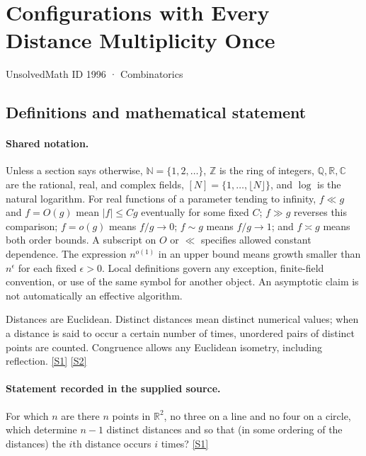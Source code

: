 \documentclass[11pt,a4paper]{article}
\newcommand{\N}{\mathbb{N}}
\newcommand{\Z}{\mathbb{Z}}
\newcommand{\Q}{\mathbb{Q}}
\newcommand{\R}{\mathbb{R}}
\newcommand{\C}{\mathbb{C}}
\newcommand{\sref}[2]{\hyperlink{source:#1:#2}{[S#2]}}
\begin{document}

\setcounter{section}{1995}

\section{Configurations with Every Distance Multiplicity Once}\label{1996}

{\small\sffamily UnsolvedMath ID 1996 · Combinatorics}

\subsection{Definitions and mathematical statement}

\paragraph{Shared notation.}Unless a section says otherwise, $\N=\{1,2,\ldots\}$,
$\Z$ is the ring of integers, $\Q,\R,\C$ are the rational, real, and complex
fields, $[N]=\{1,\ldots,\lfloor N\rfloor\}$, and $\log$ is the natural
logarithm. For real functions of a parameter tending to infinity,
$f\ll g$ and $f=O(g)$ mean $|f|\leq Cg$ eventually for some fixed $C$;
$f\gg g$ reverses this comparison; $f=o(g)$ means $f/g\to0$;
$f\sim g$ means $f/g\to1$; and $f\asymp g$ means both order bounds.
A subscript on $O$ or $\ll$ specifies allowed constant dependence.
The expression $n^{o(1)}$ in an upper bound means growth smaller than
$n^\epsilon$ for each fixed $\epsilon>0$. Local definitions govern any
exception, finite-field convention, or use of the same symbol for another
object. An asymptotic claim is not automatically an effective algorithm.



Distances are Euclidean. Distinct distances mean distinct numerical values; when a distance is said to occur a certain number of times, unordered pairs of distinct points are counted. Congruence allows any Euclidean isometry, including reflection. \sref{1996}{1} \sref{1996}{2}

\paragraph{Statement recorded in the supplied source.}
For which $n$ are there $n$ points in $\mathbb{R}^2$, no three on a line and no four on a circle, which determine $n-1$ distinct distances and so that (in some ordering of the distances) the $i$th distance occurs $i$ times? \sref{1996}{1}
\end{document}
